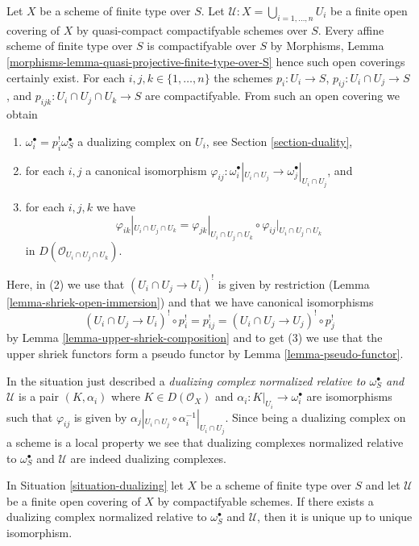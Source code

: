 \noindent
Let $X$ be a scheme of finite type over $S$.
Let $\mathcal{U} : X = \bigcup_{i = 1, \ldots, n} U_i$
be a finite open covering of $X$ by quasi-compact compactifyable
schemes over $S$. Every affine scheme of finite type
over $S$ is compactifyable over $S$ by
Morphisms, Lemma \ref{morphisms-lemma-quasi-projective-finite-type-over-S}
hence such open coverings certainly exist.
For each $i, j, k \in \{1, \ldots, n\}$
the schemes $p_i : U_i \to S$, $p_{ij} : U_i \cap U_j \to S$,
and $p_{ijk} : U_i \cap U_j \cap U_k \to S$ are compactifyable.
From such an open covering we obtain
\begin{enumerate}
\item $\omega_i^\bullet = p_i^!\omega_S^\bullet$
a dualizing complex on $U_i$, see Section \ref{section-duality},
\item for each $i, j$ a canonical isomorphism
$\varphi_{ij} :
\omega_i^\bullet|_{U_i \cap U_j} \to \omega_j^\bullet|_{U_i \cap U_j}$, and
\item
\label{item-cocycle-glueing}
for each $i, j, k$ we have
$$
\varphi_{ik}|_{U_i \cap U_j \cap U_k} =
\varphi_{jk}|_{U_i \cap U_j \cap U_k} \circ
\varphi_{ij}|_{U_i \cap U_j \cap U_k}
$$
in $D(\mathcal{O}_{U_i \cap U_j \cap U_k})$.
\end{enumerate}
Here, in (2) we use that $(U_i \cap U_j \to U_i)^!$
is given by restriction (Lemma \ref{lemma-shriek-open-immersion})
and that we have canonical isomorphisms
$$
(U_i \cap U_j \to U_i)^! \circ p_i^! = p_{ij}^! =
(U_i \cap U_j \to U_j)^! \circ p_j^!
$$
by Lemma \ref{lemma-upper-shriek-composition} and to get (3) we use
that the upper shriek functors form a pseudo functor by
Lemma \ref{lemma-pseudo-functor}.

\medskip\noindent
In the situation just described a
{\it dualizing complex normalized relative to $\omega_S^\bullet$
and $\mathcal{U}$} is a pair $(K, \alpha_i)$ where $K \in D(\mathcal{O}_X)$
and $\alpha_i : K|_{U_i} \to \omega_i^\bullet$ are isomorphisms
such that $\varphi_{ij}$ is given by
$\alpha_j|_{U_i \cap U_j} \circ \alpha_i^{-1}|_{U_i \cap U_j}$.
Since being a dualizing complex on a scheme is a local property
we see that dualizing complexes normalized relative to $\omega_S^\bullet$
and $\mathcal{U}$ are indeed dualizing complexes.

\begin{lemma}
\label{lemma-good-dualizing-unique}
In Situation \ref{situation-dualizing} let $X$ be a scheme of finite type
over $S$ and let $\mathcal{U}$ be a finite open covering of $X$
by compactifyable schemes. If there exists a dualizing complex
normalized relative to $\omega_S^\bullet$ and $\mathcal{U}$, then it is unique
up to unique isomorphism.
\end{lemma}

